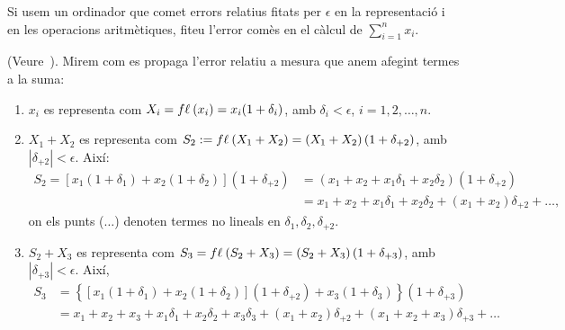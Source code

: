 \documentclass[a4paper,twoside,12pt]{exam}
\begin{document}
\begin{questions}
\question\label{prob:3}
Si usem un ordinador que comet errors relatius fitats per $\epsilon$ en la
representació i en les operacions aritmètiques, fiteu l'error comès en el càlcul
de $\sum_{i=1}^{n} x_{i}$.
%
\begin{solution}
(Veure~\cite{AubanellBD91}). Mirem com es propaga l'error relatiu a mesura que
anem afegint termes a la suma:
\begin{enumerate}[label=(\roman*), ref=(\roman*)]
	\item $x_{i}$ es representa com $X_{i} = f\ell_{\mathrm{}}\left(x_{i}\right) =
		x_{i}(1+\delta_{i})$, amb $\delta_{i} < \epsilon$,
		$i=1,2,\dots,n$.
	\item $X_{1}+X_{2}$ es representa com
		$S_{2} := f\ell_{\mathrm{}}\left(X_{1}+X_{2}\right) = \left(X_{1}+X_{2}\right) 
		\left(1+\delta_{+2}\right)$, amb $|\delta_{+2}|< \epsilon$. Així:
		\begin{align}
			S_{2} =\left[ x_{1}\left(1 + \delta_{1}\right) +
			x_{2}\left(1 + \delta_{2}\right)\right]
			\left(1 + \delta_{+2}\right)
			      &= \left(x_{1} + x_{2} + x_{1}\delta_{1}
				      + x_{2}\delta_{2}\right)\left(1 +
			      \delta_{+2}\right)\nonumber\\
			      &= x_{1} + x_{2} + x_{1}\delta_{1} +
			      x_{2}\delta_{2} + \left(x_{1} +
			      x_{2}\right)\delta_{+2} + \dots,
			      \label{eq:S2}
		\end{align}
		on els punts ($\dots$) denoten termes no lineals en $\delta_{1},
		\delta_{2}, \delta_{+2}$.
	\item $S_{2} + X_{3}$ es representa com $S_{3} = f\ell_{\mathrm{}}\left(S_{2} + X_{3}\right)
		=\left(S_{2} + X_{3}\right)\left(1 + \delta_{+3}\right)$, amb
		$|\delta_{+3}| < \epsilon$. Així,
		\begin{align*}
			S_{3} &=\left\{\left[x_{1}\left(1 + \delta_{1}\right) +
				x_{2}\left(1 + \delta_{2}\right)\right]
				\left(1+\delta_{+2}\right) +
				x_{3}\left(1+\delta_{3}\right)\right\}
				\left(1 + \delta_{+3}\right)\\
			      &= x_{1} + x_{2} + x_{3}
			      	+ x_{1}\delta_{1} + x_{2}\delta_{2} 
			      	+ x_{3}\delta_{3}
			      	+ \left(x_{1} + x_{2}\right)\delta_{+2}
			      	+ \left(x_{1} + x_{2} + x_{3}\right)\delta_{+3}
			      	+ \dots
		\end{align*}

\end{enumerate}
\end{solution}
\end{questions}
\end{document}
